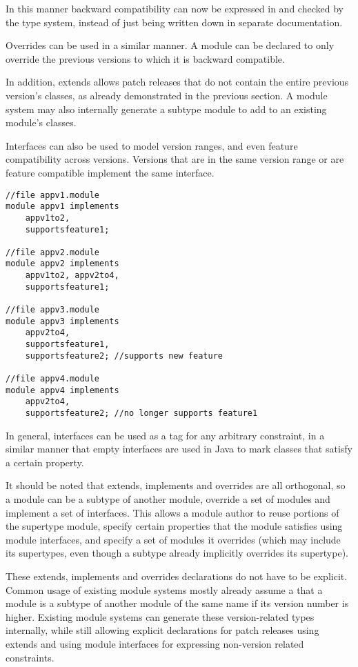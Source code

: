 In this manner backward compatibility can now be expressed in 
and checked by the type system, instead of just being written
down in separate documentation.

Overrides can be used in a similar manner. A module can be declared to only 
override the previous versions to which it is backward compatible.

In addition, extends allows patch releases that do not contain 
the entire previous version's classes, as already demonstrated in
the previous section. A module system may also internally generate
a subtype module to add to an existing module's classes.

Interfaces can also be used to model version ranges, and even feature
compatibility across versions. Versions that are in the same version 
range or are feature compatible implement the same interface.

\begin{lstlisting}[caption=Interfaces as Properties]
//file appv1.module
module appv1 implements 
	appv1to2, 
	supportsfeature1;

//file appv2.module
module appv2 implements 
	appv1to2, appv2to4, 
	supportsfeature1;

//file appv3.module
module appv3 implements 
	appv2to4, 
	supportsfeature1, 
	supportsfeature2; //supports new feature

//file appv4.module
module appv4 implements 
	appv2to4, 
	supportsfeature2; //no longer supports feature1
\end{lstlisting}

In general, interfaces can be used as a tag for any arbitrary constraint, 
in a similar manner that empty interfaces are used in Java to mark classes 
that satisfy a certain property.

It should be noted that extends, implements and overrides are all orthogonal,
so a module can be a subtype of another module, override a set of modules and
implement a set of interfaces. This allows a module author to reuse portions
of the supertype module, specify certain properties that the module satisfies
using module interfaces, and specify a set of modules it overrides (which may
include its supertypes, even though a subtype already implicitly overrides
its supertype).

These extends, implements and overrides declarations do not have to be explicit.
Common usage of existing module systems mostly already assume a that a 
module is a subtype of another module of the same name if its version 
number is higher. Existing module systems can generate these version-related types 
internally, while still allowing explicit declarations for patch releases 
using extends and using module interfaces for expressing non-version
related constraints.

